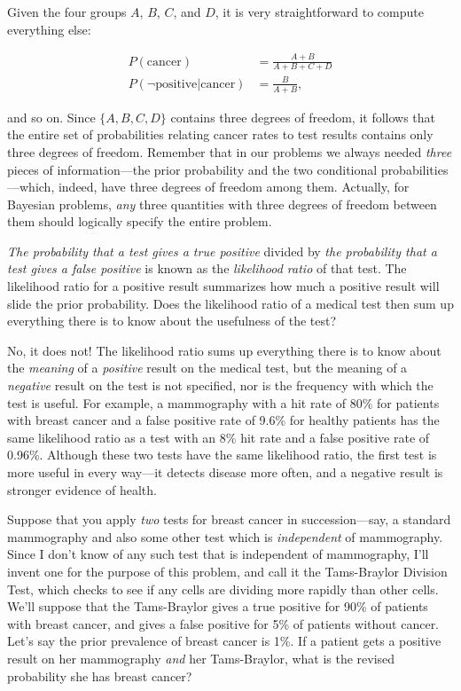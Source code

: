 {
 Given the four groups $A$, $B$, $C$, and $D$, it is very straightforward
to compute everything else:}

\begin{align*}
 P(\text{cancer}) &= \frac{A + B}{A + B + C + D} \\
 P(\lnot\text{positive}|\text{cancer}) &= \frac{B}{A + B},
\end{align*}

{
 and so on. Since $\{A,B,C,D\}$
contains three degrees of freedom, it follows that the entire set of
probabilities relating cancer rates to test results contains only three
degrees of freedom. Remember that in our problems we always needed
\textit{three} pieces of information---the prior probability and the
two conditional probabilities---which, indeed, have three degrees of
freedom among them. Actually, for Bayesian problems, \textit{any} three
quantities with three degrees of freedom between them should logically
specify the entire problem.}

\hr

{
 \textit{The probability that a test gives a true positive} divided
by \textit{the probability that a }\textit{test gives a false positive}
is known as the \textit{likelihood ratio} of that test. The likelihood
ratio for a positive result summarizes how much a positive result will
slide the prior probability. Does the likelihood ratio of a medical
test then sum up everything there is to know about the usefulness of
the test?}

{
 No, it does not! The likelihood ratio sums up everything there is
to know about the \textit{meaning} of a \textit{positive} result on the
medical test, but the meaning of a \textit{negative} result on the test
is not specified, nor is the frequency with which the test is useful.
For example, a mammography with a hit rate of 80\% for patients with
breast cancer and a false positive rate of 9.6\% for healthy patients
has the same likelihood ratio as a test with an 8\% hit rate and a
false positive rate of 0.96\%. Although these two tests have the same
likelihood ratio, the first test is more useful in every way---it
detects disease more often, and a negative result is stronger evidence
of health.}

\hr
{
 Suppose that you apply \textit{two} tests for breast cancer in
succession---say, a standard mammography and also some other test which
is \textit{independent} of mammography. Since I don't
know of any such test that is independent of mammography,
I'll invent one for the purpose of this problem, and
call it the Tams-Braylor Division Test, which checks to see if any
cells are dividing more rapidly than other cells. We'll
suppose that the Tams-Braylor gives a true positive for 90\% of
patients with breast cancer, and gives a false positive for 5\% of
patients without cancer. Let's say the prior prevalence
of breast cancer is 1\%. If a patient gets a positive result on her
mammography \textit{and} her Tams-Braylor, what is the revised
probability she has breast cancer?}

